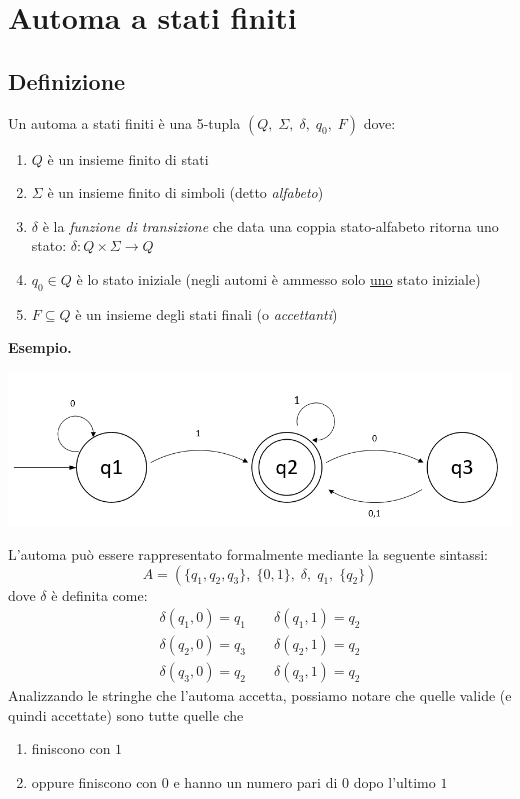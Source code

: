 \documentclass[italian]{article}
\newcommand{\example}{\noindent\textbf{Esempio.\quad}}
\begin{document}
\pagebreak

\section{Automa a stati finiti}
\subsection{Definizione}
\label{sec:automDefinition}
Un automa a stati finiti è una 5-tupla $(Q,\;\Sigma,\;\delta,\;q_0,\;F)$ dove:
\begin{enumerate}
	\item $Q$ è un insieme finito di stati
	\item $\Sigma$ è un insieme finito di simboli (detto \textit{alfabeto})
	\item $\delta$ è la \textit{funzione di transizione} che data una coppia stato-alfabeto ritorna uno stato: $\delta: Q\times\Sigma \to Q$
	\item $q_0 \in Q$ è lo stato iniziale (negli automi è ammesso solo \underline{uno} stato iniziale)
	\item $F \subseteq Q$ è un insieme degli stati finali (o \textit{accettanti})
\end{enumerate}
\example
\begin{center}
	\includegraphics[width=0.8\linewidth]{images/automa2}
\end{center}
L'automa può essere rappresentato formalmente mediante la seguente sintassi:
\[
	A = (\{q_1,q_2,q_3\},\; \{0,1\},\; \delta,\; q_1,\; \{q_2\}) 
\]
dove $\delta$ è definita come:
\begin{gather*}
	\delta(q_1,0) = q_1 \qquad \delta(q_1,1) = q_2 \\
	\delta(q_2,0) = q_3 \qquad \delta(q_2,1) = q_2 \\
	\delta(q_3,0) = q_2 \qquad \delta(q_3,1) = q_2
\end{gather*}
Analizzando le stringhe che l'automa accetta, possiamo notare che quelle valide (e quindi accettate) sono tutte quelle che
\begin{enumerate}
	\item finiscono con $1$
	\item oppure finiscono con $0$ e hanno un numero pari di $0$ dopo l'ultimo $1$
\end{enumerate}
\end{document}
